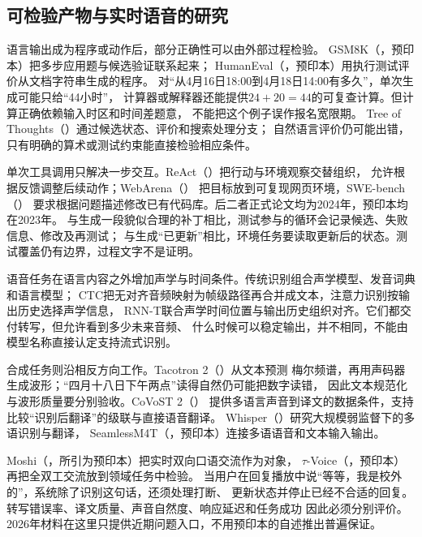 \subsection{可检验产物与实时语音的研究}
\label{sec:nlp-history-execution-speech}

语言输出成为程序或动作后，部分正确性可以由外部过程检验。
GSM8K（\citeyear{nlp-intro-cobbe2021}，预印本）把多步应用题与候选验证联系起来；
HumanEval（\citeyear{nlp-intro-chen2021}，预印本）用执行测试评价从文档字符串生成的程序。
对“从4月16日18:00到4月18日14:00有多久”，单次生成可能只给“44小时”，
计算器或解释器还能提供$24+20=44$的可复查计算。但计算正确依赖输入时区和时间差题意，
不能把这个例子误作报名宽限期。
Tree of Thoughts（\citeyear{nlp-intro-yao2023tot}）通过候选状态、评价和搜索处理分支；
自然语言评价仍可能出错，只有明确的算术或测试约束能直接检验相应条件。

单次工具调用只解决一步交互。ReAct（\citeyear{yao2023react}）把行动与环境观察交替组织，
允许根据反馈调整后续动作；WebArena（\citeyear{nlp-intro-zhou2024webarena}）
把目标放到可复现网页环境，SWE-bench（\citeyear{nlp-intro-jimenez2024}）
要求根据问题描述修改已有代码库。后二者正式论文均为2024年，预印本均在2023年。
与生成一段貌似合理的补丁相比，测试参与的循环会记录候选、失败信息、修改及再测试；
与生成“已更新”相比，环境任务要读取更新后的状态。测试覆盖仍有边界，过程文字不是证明。

语音任务在语言内容之外增加声学与时间条件。传统识别组合声学模型、发音词典和语言模型；
CTC把无对齐音频映射为帧级路径再合并成文本，注意力识别按输出历史选择声学信息，
RNN-T联合声学时间位置与输出历史组织对齐。它们都交付转写，但允许看到多少未来音频、
什么时候可以稳定输出，并不相同，不能由模型名称直接认定支持流式识别。

合成任务则沿相反方向工作。Tacotron 2（\citeyear{nlp-intro-shen2018}）从文本预测
梅尔频谱，再用声码器生成波形；“四月十八日下午两点”读得自然仍可能把数字读错，
因此文本规范化与波形质量要分别验收。CoVoST 2（\citeyear{nlp-intro-wang2021covost}）
提供多语言声音到译文的数据条件，支持比较“识别后翻译”的级联与直接语音翻译。
Whisper（\citeyear{radford2023whisper}）研究大规模弱监督下的多语识别与翻译，
SeamlessM4T（\citeyear{nlp-intro-seamless2023}，预印本）连接多语语音和文本输入输出。

Moshi（\citeyear{defossez2024moshi}，所引为预印本）把实时双向口语交流作为对象，
$\tau$-Voice（\citeyear{nlp-intro-ray2026}，预印本）再把全双工交流放到领域任务中检验。
当用户在回复播放中说“等等，我是校外的”，系统除了识别这句话，还须处理打断、
更新状态并停止已经不合适的回复。转写错误率、译文质量、声音自然度、响应延迟和任务成功
因此必须分别评价。2026年材料在这里只提供近期问题入口，不用预印本的自述推出普遍保证。

